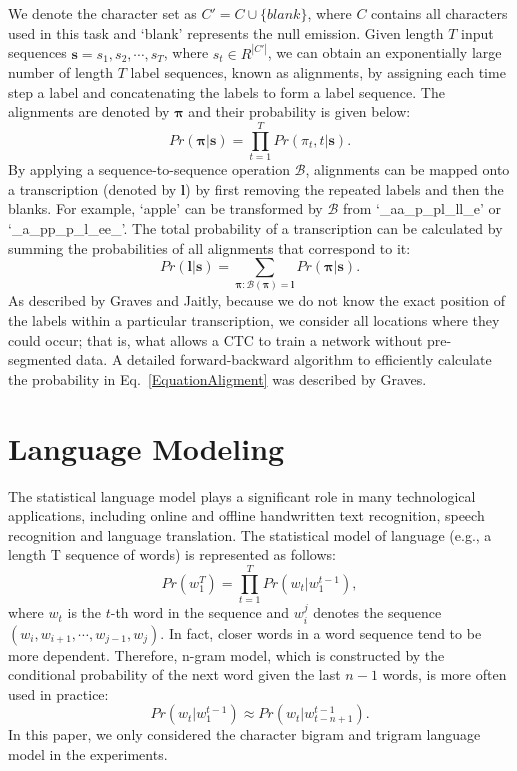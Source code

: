 \documentclass[10pt,conference,a4paper]{IEEEtran}
\begin{document}
We denote the character set as $C'=C \cup \{blank\}$, where $C$ contains all characters used in this task and `blank' represents the null emission.
Given length $T$ input sequences $\bm{s}=s_1,s_2,\cdots,s_T$, where $s_t \in R^{|C'|}$, we can obtain an exponentially large number of length $T$ label sequences, known as alignments, by assigning each time step a label and concatenating the labels to form a label sequence.
The alignments are denoted by $\bm{\pi}$ and their probability is given below:
\begin{equation}
    Pr(\bm{\pi}|\bm{s}) = \prod_{t=1}^T Pr(\pi_t,t|\bm{s}).
\end{equation}
By applying a sequence-to-sequence operation $\mathscr{B}$, alignments can be mapped onto a transcription (denoted by $\bm{l}$) by first removing the repeated labels and then the blanks. For example, `apple' can be transformed by $\mathscr{B}$ from `\_aa\_p\_pl\_ll\_e' or `\_a\_pp\_p\_l\_ee\_'. The total probability of a transcription can be calculated by summing the probabilities of all alignments that correspond to it:
\begin{equation}
\label{EquationAligment}
    Pr(\bm{l}|\bm{s}) = \sum_{\bm{\pi}:\mathscr{B}(\bm{\pi})=\bm{l}} Pr(\bm{\pi}|\bm{s}).
\end{equation}
As described by Graves and Jaitly\cite{graves2014towards}, because we do not know the exact position of the labels within a particular transcription, we consider all locations where they could occur;
that is, what allows a CTC to train a network without pre-segmented data.
A detailed forward-backward algorithm to efficiently calculate the probability in Eq.~\eqref{EquationAligment} was described by Graves\cite{graves2012supervised}.


\section{Language Modeling}
The statistical language model plays a significant role in many technological applications, including online and offline handwritten text recognition, speech recognition and language translation.
The statistical model of language (e.g., a length T sequence of words) is represented as follows:
\begin{equation}
    \label{EquationLanguageModel}
    Pr(w_{1}^T)=\prod_{t=1}^T Pr(w_t|w_{1}^{t-1}),
\end{equation}
where $w_t$ is the $t$-th word in the sequence and $w_{i}^j$ denotes the sequence $(w_i,w_{i+1},\cdots,w_{j-1},w_{j})$.
In fact, closer words in a word sequence tend to be more dependent.
Therefore, n-gram model, which is constructed by the conditional probability of the next word given the last $n-1$ words, is more often used in practice:
\begin{equation}
    Pr(w_t|w_{1}^{t-1}) \approx Pr(w_t|w_{t-n+1}^{t-1}).
\end{equation}
In this paper, we only considered the character bigram and trigram language model in the experiments.
\end{document}

